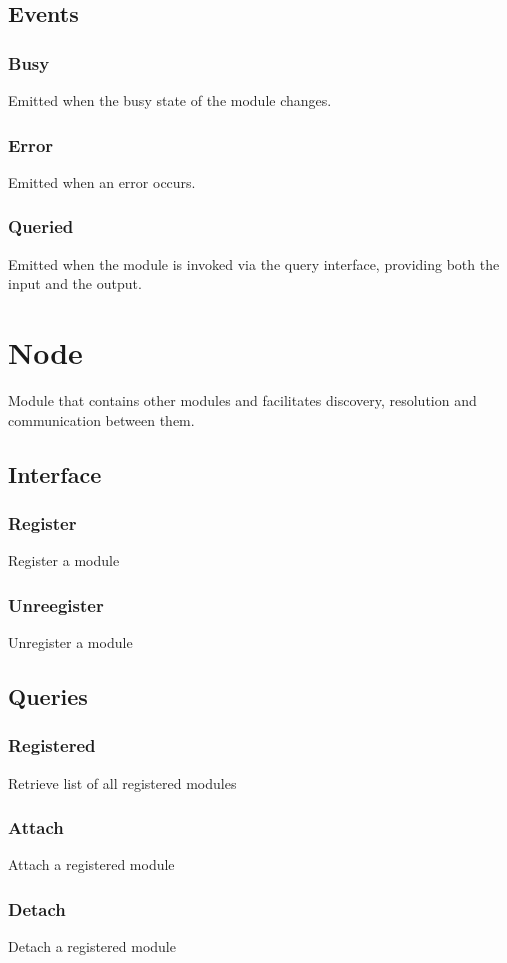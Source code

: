 \documentclass{article}
\begin{document}
\subsection{Events}
\subsubsection{Busy}
Emitted when the busy state of the module changes.
\subsubsection{Error}
Emitted when an error occurs.
\subsubsection{Queried}
Emitted when the module is invoked via the query interface, providing both the input and the output.

\section{Node}
Module that contains other modules and facilitates discovery, resolution and communication between them.
\subsection{Interface}
\subsubsection{Register}
Register a module
\subsubsection{Unreegister}
Unregister a module

\subsection{Queries}
\subsubsection{Registered}
Retrieve list of all registered modules
\subsubsection{Attach}
Attach a registered module
\subsubsection{Detach}
Detach a registered module
\end{document}
